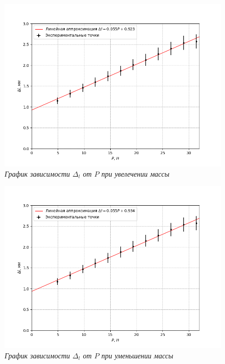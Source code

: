 \documentclass[a4paper,12pt]{article}
\begin{document}
\begin{figure}[h!]
    \includegraphics[width=1\textwidth]{adding-wheight.png}
    \caption{\textit{График зависимости $\Delta_l$ от $P$ при увелечении массы}}
    \label{adding-wheight}
\end{figure}

\begin{figure}[h!]
    \includegraphics[width=1\textwidth]{removing-wheight.png}
    \caption{\textit{График зависимости $\Delta_l$ от $P$ при уменьшении массы}}
    \label{removing-wheight}
\end{figure}
\end{document}
